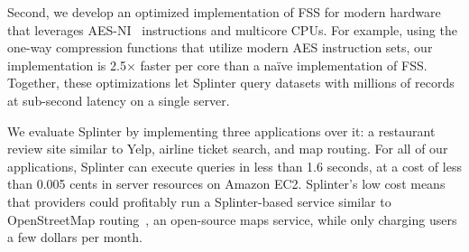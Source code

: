 Second, we develop an optimized implementation of FSS for modern hardware that leverages AES-NI~\cite{aes-ni} instructions and multicore CPUs.
For example, using the one-way compression functions that utilize modern AES instruction sets, our implementation is 2.5$\times$ faster per core than a na\"ive implementation of FSS.
Together, these optimizations let Splinter query datasets with millions of records at sub-second latency on a single server.

We evaluate Splinter by implementing 
three applications over it: a restaurant review site similar to Yelp, 
airline ticket search, and map routing.
For all of our applications, Splinter can execute queries in less than 1.6 seconds, at a cost of less than 0.005 cents in server resources on Amazon EC2.
Splinter's low cost means that providers could profitably run a Splinter-based service
similar to OpenStreetMap routing~\cite{osm}, an open-source maps service, while only charging users a few dollars per month.




